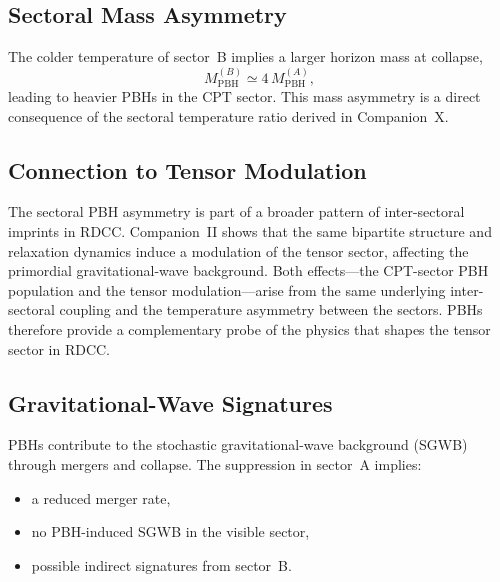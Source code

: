 \documentclass[11pt,a4paper]{article}
\begin{document}
\subsection{Sectoral Mass Asymmetry}

The colder temperature of sector~B implies a larger horizon mass at collapse,
\begin{equation}
M_{\mathrm{PBH}}^{(B)} \simeq 4\, M_{\mathrm{PBH}}^{(A)},
\end{equation}
leading to heavier PBHs in the CPT sector. This mass asymmetry is a direct consequence of the
sectoral temperature ratio derived in Companion~X.


\subsection{Connection to Tensor Modulation}

The sectoral PBH asymmetry is part of a broader pattern of inter-sectoral imprints in RDCC.
Companion~II shows that the same bipartite structure and relaxation dynamics induce a
modulation of the tensor sector, affecting the primordial gravitational-wave background. Both
effects—the CPT-sector PBH population and the tensor modulation—arise from the same
underlying inter-sectoral coupling and the temperature asymmetry between the sectors. PBHs
therefore provide a complementary probe of the physics that shapes the tensor sector in RDCC.


\subsection{Gravitational-Wave Signatures}

PBHs contribute to the stochastic gravitational-wave background (SGWB) through mergers and
collapse. The suppression in sector~A implies:
\begin{itemize}
\item a reduced merger rate,
\item no PBH-induced SGWB in the visible sector,
\item possible indirect signatures from sector~B.
\end{itemize}
\end{document}
